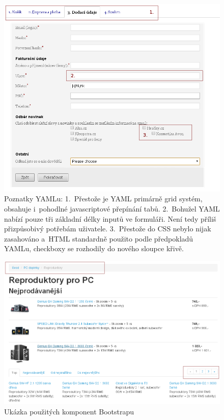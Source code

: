 \documentclass[thesis=B,czech]{FITthesis}[2012/06/26]
\begin{document}
\begin{figure}[h]
	\begin{center}
	\includegraphics[scale=0.7]{images/image19.png}
	\end{center}
	\caption[Poznatky YAMLu]{Poznatky YAMLu: 1.~Přestože je YAML primárně grid  systém, obsahuje i~pohodlné javascriptové přepínání tabů. 2.~Bohužel YAML nabízí pouze tři základní délky inputů ve formuláři. Není tedy příliš přizpůsobivý potřebám uživatele. 3.~Přestože do \gls{CSS} nebylo nijak zasahováno a~\gls{HTML} standardně použito podle předpokladů YAMLu, checkboxy se rozhodily do nového sloupce křivě.}
	\label{imgCom}
\end{figure}

\begin{figure}[h]
	\begin{center}
	\includegraphics[scale=0.5]{images/image08.png}
	\end{center}
	\caption{Ukázka použitých komponent Bootstrapu}
	\label{imgB1}
\end{figure}
\end{document}
